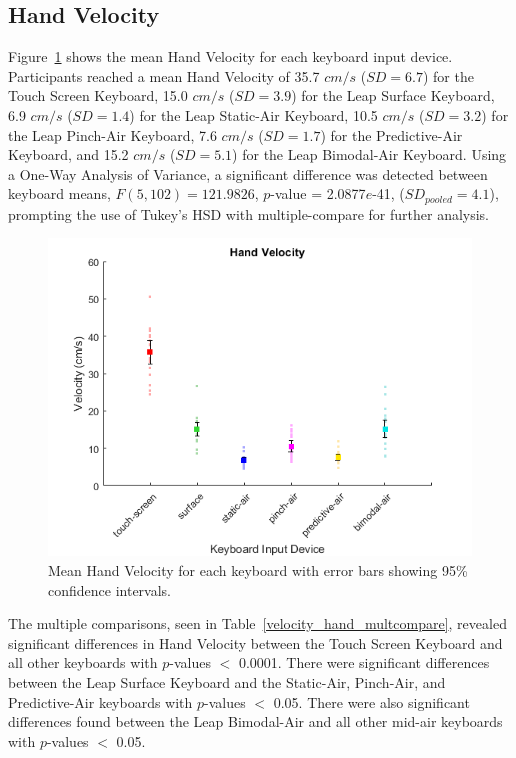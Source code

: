 \subsection{Hand Velocity}
Figure~\ref{fig_velocity_hand_mean} shows the mean Hand Velocity for each keyboard input device. Participants reached a mean Hand Velocity of 35.7 $cm/s$ ($SD = 6.7$) for the Touch Screen Keyboard, 15.0 $cm/s$ ($SD = 3.9$) for the Leap Surface Keyboard, 6.9 $cm/s$ ($SD = 1.4$) for the Leap Static-Air Keyboard, 10.5 $cm/s$ ($SD = 3.2$) for the Leap Pinch-Air Keyboard, 7.6 $cm/s$ ($SD = 1.7$) for the Predictive-Air Keyboard, and 15.2 $cm/s$ ($SD = 5.1$) for the Leap Bimodal-Air Keyboard. Using a One-Way Analysis of Variance, a significant difference was detected between keyboard means, $F(5, 102) = 121.9826$, $p$-value = 2.0877$e$-41, ($SD_{pooled} = 4.1$), prompting the use of Tukey's HSD with multiple-compare for further analysis.

\begin{figure}[h]
	\centering
	\includegraphics{fig_velocity_hand_mean}
	\caption[Mean Hand Velocity]{Mean Hand Velocity for each keyboard with error bars showing 95\% confidence intervals.}
	\label{fig_velocity_hand_mean}
\end{figure}

The multiple comparisons, seen in Table~\ref{velocity_hand_multcompare}, revealed significant differences in Hand Velocity between the Touch Screen Keyboard and all other keyboards with $p$-values $<$ 0.0001. There were significant differences between the Leap Surface Keyboard and the Static-Air, Pinch-Air, and Predictive-Air keyboards with $p$-values $<$ 0.05. There were also significant differences found between the Leap Bimodal-Air and all other mid-air keyboards with $p$-values $<$ 0.05.

